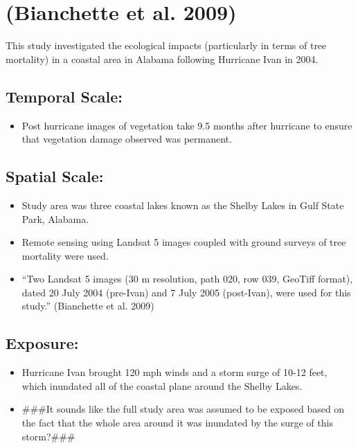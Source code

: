 \documentclass[
]{article}
\providecommand{\tightlist}{%
  \setlength{\itemsep}{0pt}\setlength{\parskip}{0pt}}
\begin{document}
\hypertarget{bianchette2009ecological}{%
\section{(Bianchette et al. 2009)}\label{bianchette2009ecological}}

This study investigated the ecological impacts (particularly in terms of
tree mortality) in a coastal area in Alabama following Hurricane Ivan in
2004.

\hypertarget{temporal-scale-6}{%
\subsection{Temporal Scale:}\label{temporal-scale-6}}

\begin{itemize}
\tightlist
\item
  Post hurricane images of vegetation take 9.5 months after hurricane to
  ensure that vegetation damage observed was permanent.
\end{itemize}

\hypertarget{spatial-scale-6}{%
\subsection{Spatial Scale:}\label{spatial-scale-6}}

\begin{itemize}
\tightlist
\item
  Study area was three coastal lakes known as the Shelby Lakes in Gulf
  State Park, Alabama.
\item
  Remote sensing using Landsat 5 images coupled with ground surveys of
  tree mortality were used.
\item
  ``Two Landsat 5 images (30 m resolution, path 020, row 039, GeoTiff
  format), dated 20 July 2004 (pre-Ivan) and 7 July 2005 (post-Ivan),
  were used for this study.'' (Bianchette et al. 2009)
\end{itemize}

\hypertarget{exposure-5}{%
\subsection{Exposure:}\label{exposure-5}}

\begin{itemize}
\tightlist
\item
  Hurricane Ivan brought 120 mph winds and a storm surge of 10-12 feet,
  which inundated all of the coastal plane around the Shelby Lakes.
\item
  \#\#\#It sounds like the full study area was assumed to be exposed
  based on the fact that the whole area around it was inundated by the
  surge of this storm?\#\#\#
\end{itemize}
\end{document}
